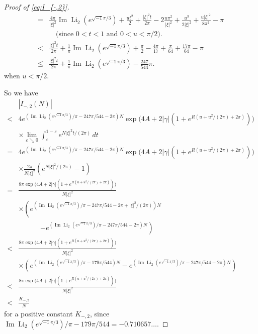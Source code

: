 \documentclass[a4paper]{amsart}
\theoremstyle{plain}
\theoremstyle{definition}
\theoremstyle{remark}
\newcommand{\Li}{\operatorname{Li}}
\renewcommand{\Im}{\operatorname{Im}}
\numberwithin{equation}{section}
\begin{document}
\begin{proof}[Proof of \eqref{eq:I_{-,2}}]
\begin{equation*}
\begin{split}
  =&
  \frac{4\pi}{|\xi|^2}\Im\Li_2(e^{\sqrt{-1}\pi/3})
  +\frac{ut^2}{2}
  +\frac{|\xi|^2t}{2\pi}
  -2\frac{u\pi^2}{|\xi|^2}
  +\frac{u^3}{2|\xi|^2}
  +\frac{u|\xi|^2}{8\pi^2}
  -\pi
  \\
  &\quad\text{(since $0<t<1$ and $0<u<\pi/2$)}.
  \\
  <&
  \frac{|\xi|^2t}{2\pi}
  +\frac{1}{\pi}\Im\Li_2(e^{\sqrt{-1}\pi/3})
  +\frac{\pi}{2}
  -\frac{4\pi}{17}
  +\frac{\pi}{64}
  +\frac{17\pi}{64}
  -\pi
  \\
  \le&
  \frac{|\xi|^2t}{2\pi}
  +
  \frac{1}{\pi}\Im\Li_2(e^{\sqrt{-1}\pi/3})
  -\frac{247}{544}\pi.
\end{split}
\end{equation*}
when $u<\pi/2$.
\par
So we have
\begin{equation*}
\begin{split}
  &|I_{-,2}(N)|
  \\
  <&
  4e^{(\Im\Li_2(e^{\sqrt{-1}\pi/3})/\pi-247\pi/544-2\pi)N}
  \exp\bigl(4A+2|\gamma|(1+e^{R(u+u^2/(2\pi)+2\pi)})\bigr)
  \\
  &\times
  \lim_{\varepsilon\searrow0}
  \int_{\varepsilon}^{1-\varepsilon}e^{N|\xi|^2t/(2\pi)}\,dt
  \\
  =&
  4e^{(\Im\Li_2(e^{\sqrt{-1}\pi/3})/\pi-247\pi/544-2\pi)N}
  \exp\bigl(4A+2|\gamma|(1+e^{R(u+u^2/(2\pi)+2\pi)})\bigr)
  \\
  &\times
  \frac{2\pi}{N|\xi|^2}(e^{N|\xi|^2/(2\pi)}-1)
  \\
  =&
  \frac{8\pi\exp\bigl(4A+2|\gamma|(1+e^{R(u+u^2/(2\pi)+2\pi)})\bigr)}{N|\xi|^2}
  \\
  &\times
  \left(
    e^{(\Im\Li_2(e^{\sqrt{-1}\pi/3})/\pi-247\pi/544-2\pi+|\xi|^2/(2\pi))N}
  \right.
  \\
  &\phantom{\times}\qquad
  \left.
    -
    e^{(\Im\Li_2(e^{\sqrt{-1}\pi/3})/\pi-247\pi/544-2\pi)N}
  \right)
  \\
  <&
  \frac{8\pi\exp\bigl(4A+2|\gamma|(1+e^{R(u+u^2/(2\pi)+2\pi)})\bigr)}{N|\xi|^2}
  \\
  &\times
  \left(
    e^{(\Im\Li_2(e^{\sqrt{-1}\pi/3})/\pi-179\pi/544)N}
    -
    e^{(\Im\Li_2(e^{\sqrt{-1}\pi/3})/\pi-247\pi/544-2\pi)N}
  \right)
  \\
  <&
  \frac{8\pi\exp\bigl(4A+2|\gamma|(1+e^{R(u+u^2/(2\pi)+2\pi)})\bigr)}{N|\xi|^2}
  \\
  <&
  \frac{K_{-,2}}{N}
\end{split}
\end{equation*}
for a positive constant $K_{-,2}$, since $\Im\Li_2(e^{\sqrt{-1}\pi/3})/\pi-179\pi/544=-0.710657\dots$.
\end{proof}%
\end{document}

